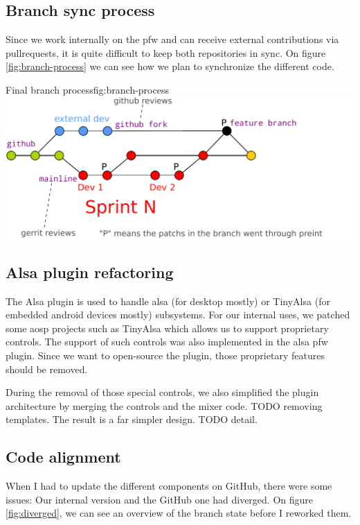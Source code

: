 \subsection{Branch sync process}
Since we work internally on the \gls{pfw} and can receive external contributions via \gls{pullrequests},
it is quite difficult to keep both repositories in sync.
On figure \ref{fig:branch-process} we can see how we plan to synchronize the different code.

\begin{figureGraphics}{Final branch process}{fig:branch-process}
    \includegraphics[width=\textwidth]{./src/img/branches-process.pdf}
\end{figureGraphics}


\subsection{Alsa plugin refactoring}
The Alsa plugin is used to handle \gls{alsa} (for desktop mostly) or TinyAlsa (for embedded \gls{android} devices mostly) subsystems.
For our internal uses, we patched some \gls{aosp} projects such as TinyAlsa which allows us to support proprietary controls.
The support of such controls was also implemented in the \gls{alsa} \gls{pfw} plugin. Since
we want to open-source the plugin, those proprietary features should be removed.

During the removal of those special controls, we also simplified the plugin
architecture by merging the controls and the mixer code. TODO removing templates.
The result is a far simpler design.
TODO detail.

\subsection{Code alignment}

When I had to update the different components on \gls{GitHub}, there were some issues:
Our internal version and the \gls{GitHub} one had diverged.
On figure \ref{fig:diverged}, we can see an overview of the branch state before I reworked them.

